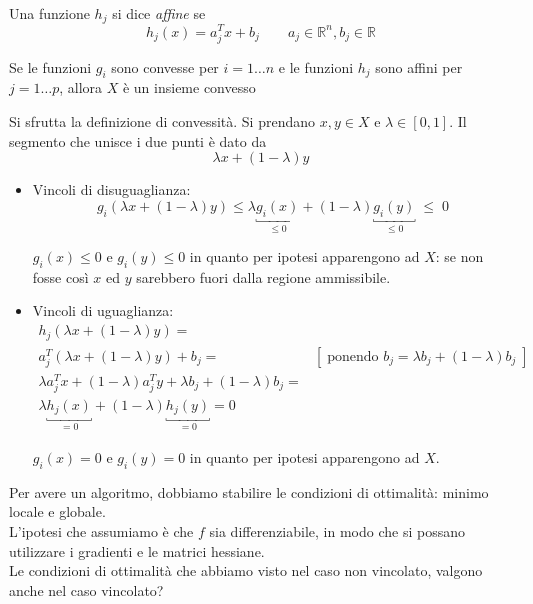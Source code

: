 \begin{defn}
Una funzione $h_j$ si dice \emph{affine} se
$$ h_j(x) = a_{j}^{T}x + b_j
\qquad
a_j \in \mathbb{R}^{n}, b_j \in \mathbb{R}
$$
\end{defn}

\begin{proposition}
Se le funzioni $g_i$ sono convesse per $i=1\ldots n$ e le funzioni
$h_j$ sono affini per $j=1\ldots p$, allora $X$ \`e un insieme convesso
\end{proposition}
\begin{thproof}
Si sfrutta la definizione di convessit\`a. Si prendano
$x,y \in X$ e $\lambda \in [0,1]$.
Il segmento che unisce i due punti \`e dato da
$$ \lambda x + (1- \lambda )y$$
\begin{itemize}
\item Vincoli di disuguaglianza:
$$ g_i(\lambda x + (1-\lambda) y)
\leq
\lambda \underbracket{ g_i(x)}_{\leq 0}
+ (1- \lambda) \underbracket{ g_i(y)}_{\leq 0}
\; \leq \;  0
$$
\begin{notes}
$g_i(x) \leq 0$ e $g_i(y) \leq 0$ in quanto per ipotesi apparengono ad
$X$: se non fosse cos\`i $x$ ed $y$ sarebbero fuori dalla regione
ammissibile.
\end{notes}
\item
Vincoli di uguaglianza:
$$
\begin{array}{lr}
  h_j(\lambda x + (1-\lambda)y) = & \\
  a_j^{T}(\lambda x + (1-\lambda)y)+ b_j = & [\; \text{ponendo } b_j = 
  \lambda b_j + (1-\lambda) b_j  \; ]   \\
  \lambda a_{j}^{T}x + (1-\lambda) a_{j}^{T}y+ 
  \lambda b_j + (1-\lambda) b_j = \\
  \lambda \underbracket{h_j(x)}_{=0} + (1-\lambda) \underbracket{h_j(y)}_{=0} = 0
\end{array}
$$
\begin{notes}
$g_i(x) = 0$ e $g_i(y) =  0$ in quanto per ipotesi apparengono ad
$X$.
\end{notes}
\end{itemize}


\end{thproof}
Per avere un algoritmo, dobbiamo stabilire le condizioni di ottimalit\`a:
minimo locale e globale. \\
L'ipotesi che assumiamo \`e che $f$ sia differenziabile, in modo
che si possano utilizzare i gradienti e le matrici hessiane. \\
Le condizioni di ottimalit\`a che abbiamo visto nel caso non vincolato,
valgono anche nel caso vincolato?

